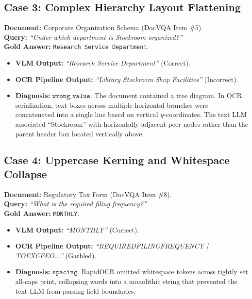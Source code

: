 \documentclass[conference]{IEEEtran}
\begin{document}
{\subsection{Case 3: Complex Hierarchy Layout Flattening}
\textbf{Document:} Corporate Organization Schema (DocVQA Item \#5). \\
\textbf{Query:} \textit{``Under which department is Stockroom organized?''} \\
\textbf{Gold Answer:} \texttt{Research Service Department}.
\begin{itemize}
    \item \textbf{VLM Output:} \textit{``Research Service Department''} (Correct).
    \item \textbf{OCR Pipeline Output:} \textit{``Library Stockroom Shop Facilities''} (Incorrect).
    \item \textbf{Diagnosis:} $\texttt{wrong\_value}$. The document contained a tree diagram. In OCR serialization, text boxes across multiple horizontal branches were concatenated into a single line based on vertical $y$-coordinates. The text LLM associated ``Stockroom'' with horizontally adjacent peer nodes rather than the parent header box located vertically above.
\end{itemize}

\subsection{Case 4: Uppercase Kerning and Whitespace Collapse}
\textbf{Document:} Regulatory Tax Form (DocVQA Item \#8). \\
\textbf{Query:} \textit{``What is the required filing frequency?''} \\
\textbf{Gold Answer:} \texttt{MONTHLY}.
\begin{itemize}
    \item \textbf{VLM Output:} \textit{``MONTHLY''} (Correct).
    \item \textbf{OCR Pipeline Output:} \textit{``REQUIREDFILINGFREQUENCY | TOEXCEEO...''} (Garbled).
    \item \textbf{Diagnosis:} $\texttt{spacing}$. RapidOCR omitted whitespace tokens across tightly set all-caps print, collapsing words into a monolithic string that prevented the text LLM from parsing field boundaries.
\end{itemize}

}
\end{document}
